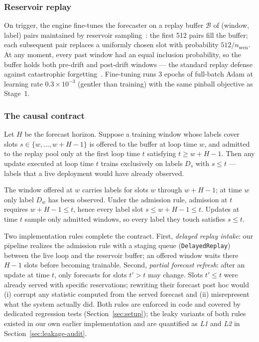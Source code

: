 \subsubsection{Reservoir replay}

On trigger, the engine fine-tunes the forecaster on a replay buffer
$\mathcal{B}$ of (window, label) pairs maintained by reservoir
sampling~\cite{vitter1985random}: the first 512 pairs fill the
buffer; each subsequent pair replaces a uniformly chosen slot with
probability $512/n_{\text{seen}}$. At any moment, every past window
had an equal inclusion probability, so the buffer holds both
pre-drift and post-drift windows --- the standard replay defense
against catastrophic forgetting~\cite{chaudhry2019continual,
rolnick2019experience}. Fine-tuning runs 3 epochs of full-batch Adam
at learning rate $0.3 \times 10^{-3}$ (gentler than training) with
the same pinball objective as Stage~1.

\subsubsection{The causal contract}

\begin{proposition}
\label{prop:causal}
Let $H$ be the forecast horizon. Suppose a training window whose
labels cover slots $s \in \{w, \dots, w+H-1\}$ is offered to the
buffer at loop time $w$, and admitted to the replay pool only at the
first loop time $t$ satisfying $t \ge w + H - 1$. Then any update
executed at loop time $t$ trains exclusively on labels
$D_s$ with $s \le t$ --- labels that a live deployment would have
already observed.
\end{proposition}
\begin{IEEEproof}
The window offered at $w$ carries labels for slots $w$ through
$w + H - 1$; at time $w$ only label $D_w$ has been observed. Under
the admission rule, admission at $t$ requires $w + H - 1 \le t$,
hence every label slot $s \le w + H - 1 \le t$. Updates at time $t$
sample only admitted windows, so every label they touch satisfies
$s \le t$.
\end{IEEEproof}

Two implementation rules complete the contract. First,
\emph{delayed replay intake}: our pipeline realizes the admission
rule with a staging queue (\texttt{DelayedReplay}) between the live
loop and the reservoir buffer; an offered window waits there
$H - 1$ slots before becoming trainable. Second, \emph{partial
forecast refresh}: after an update at time $t$, only forecasts for
slots $t' > t$ may change. Slots $t' \le t$ were already served with
specific reservations; rewriting their forecast post hoc would (i)
corrupt any statistic computed from the served forecast and (ii)
misrepresent what the system actually did. Both rules are enforced
in code and covered by dedicated regression tests
(Section~\ref{sec:setup}); the leaky variants of both rules existed
in our own earlier implementation and are quantified as
\emph{L1} and \emph{L2} in Section~\ref{sec:leakage-audit}.

